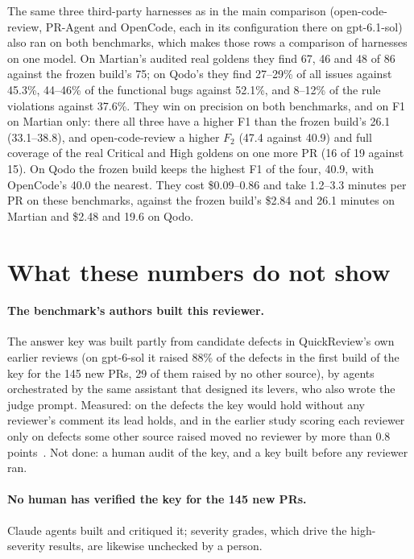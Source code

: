 \documentclass[11pt,a4paper]{article}
\newcommand{\qcr}{QuickReview}
\begin{document}
The same three third-party harnesses as in the main comparison
(open-code-review, PR-Agent and OpenCode, each in its configuration there
on gpt-6.1-sol) also ran on both benchmarks, which makes those rows a
comparison of harnesses on one model. On Martian's audited real goldens
they find 67, 46 and 48 of 86 against the frozen build's 75; on Qodo's
they find 27--29\% of all issues against 45.3\%, 44--46\% of the
functional bugs against 52.1\%, and 8--12\% of the rule violations against
37.6\%. They win on precision on both benchmarks, and on F1 on Martian only:
there all three have a higher F1 than the frozen build's 26.1 (33.1--38.8), and open-code-review a higher
$F_2$ (47.4 against 40.9) and full coverage of the real Critical and High
goldens on one more PR (16 of 19 against 15). On Qodo the frozen build keeps
the highest F1 of the four, 40.9, with OpenCode's 40.0 the nearest. They cost \$0.09--0.86 and
take 1.2--3.3 minutes per PR on these benchmarks, against the frozen
build's \$2.84 and 26.1 minutes on Martian and \$2.48 and 19.6 on Qodo.

\section{What these numbers do not show}
\label{sec:limits}

\paragraph{The benchmark's authors built this reviewer.} The answer key was
built partly from candidate defects in \qcr{}'s own earlier reviews (on gpt-6-sol it raised 88\% of the defects in the first build of the
key for the 145 new PRs, 29 of them raised by no other source), by agents orchestrated by the
same assistant that designed its levers, who also wrote the judge prompt.
Measured: on the defects the key would hold without any reviewer's comment
its lead holds, and in the earlier study scoring each reviewer only on
defects some other source raised moved no reviewer by more than 0.8
points~\cite{qcrbench}. Not done: a human audit of the key, and a key built
before any reviewer ran.

\paragraph{No human has verified the key for the 145 new PRs.} Claude
agents built and critiqued it; severity grades, which drive the
high-severity results, are likewise unchecked by a person.
\end{document}
